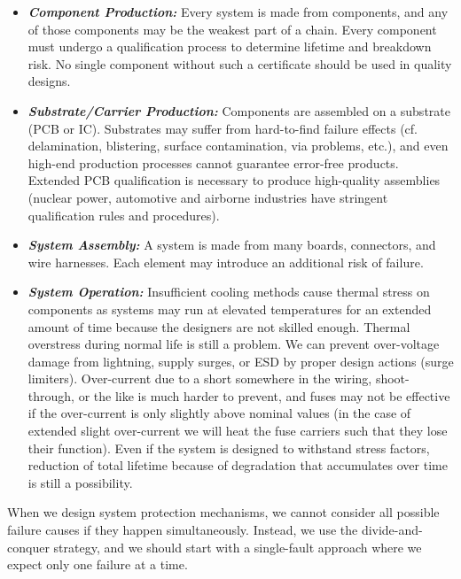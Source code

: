 \begin{itemize}[topsep=8pt,itemsep=4pt,partopsep=4pt, parsep=4pt]

    \item \textbf{\emph{Component Production:}} Every system is made from
    components, and any of those components may be the weakest part of a chain.
    Every component must undergo a qualification process to determine lifetime
    and breakdown risk.
    No single component without such a certificate should be used
    in quality designs.

    \item \textbf{\emph{Substrate/Carrier Production:}}
    Components are assembled on a substrate (\ac{PCB} or \ac{IC}).
    Substrates may suffer from hard-to-find failure effects (cf. delamination,
    blistering, surface contamination, via problems, etc.),
    and even high-end production processes cannot guarantee error-free products.
    Extended \ac{PCB} qualification is necessary to produce high-quality
    assemblies (nuclear power, automotive and airborne industries have
    stringent qualification rules and procedures).
    \item \textbf{\emph{System Assembly:}} A system is made from many boards,
    connectors, and wire harnesses.
    Each element may introduce an additional risk of failure.
    \item \textbf{\emph{System Operation:}}
    Insufficient cooling methods cause thermal stress on components as
    systems may run at elevated temperatures for an extended amount of time
    because the designers are not skilled enough.
    Thermal overstress during normal life is still a problem.
    We can prevent over-voltage damage from lightning, supply surges, or
    \ac{ESD} by proper design actions (surge limiters).
    Over-current due to a short somewhere in the wiring, shoot-through, or the
    like is much harder to prevent, and fuses may not be effective if the
    over-current is only slightly above nominal values (in the case of extended
    slight over-current we will heat the fuse carriers such that they lose their
    function). Even if the system is designed to withstand stress factors,
    reduction of total lifetime because of degradation that accumulates
    over time is still a possibility.
\end{itemize}

When we design system protection mechanisms, we cannot consider all possible
failure causes if they happen simultaneously.
Instead, we use the divide-and-conquer strategy, and we should start with
a single-fault approach where we expect only one failure at a time.

